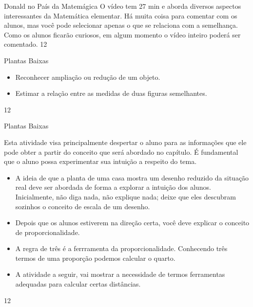 \clearpage
\begin{sugestions}{Donald no País da Matemágica}
{
O vídeo tem 27 min e aborda diversos aspectos interessantes da Matemática elementar. Há muita coisa para comentar com os alunos, mas você pode selecionar apenas o que se relaciona com a semelhança. Como os alunos ficarão curiosos, em algum momento o vídeo inteiro poderá ser comentado.
}{1}{2}
\end{sugestions}
\begin{objectives}{Plantas Baixas}
{
\begin{itemize}
\item {} 
Reconhecer ampliação ou redução de um objeto.

\item {} 
Estimar a relação entre as medidas de duas figuras semelhantes.

\end{itemize}
}{1}{2}
\end{objectives}
\begin{sugestions}{Plantas Baixas}
{
Esta atividade visa principalmente despertar o aluno para as informações que ele pode obter a partir do conceito que será abordado no capítulo. É fundamental que o aluno possa experimentar sua intuição a respeito do tema.

\begin{itemize}
\item {} 
A ideia de que a planta de uma casa mostra um desenho reduzido da situação real deve ser abordada de forma a explorar a intuição dos alunos. Inicialmente, não diga nada, não explique nada; deixe que eles descubram sozinhos o conceito de escala de um desenho.

\item {} 
Depois que os alunos estiverem na direção certa, você deve explicar o conceito de proporcionalidade.

\item {} 
A regra de três é a ferrramenta da proporcionalidade. Conhecendo três termos de uma proporção podemos calcular o quarto.

\item {} 
A atividade a seguir, vai mostrar a necessidade de termos ferramentas adequadas para calcular certas distâncias.

\end{itemize}
}{1}{2}
\end{sugestions}
\clearmargin
